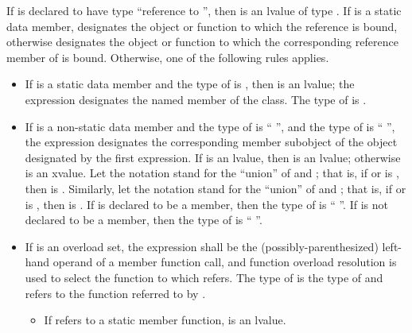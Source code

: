 \pnum
If  is declared to have type ``reference to '', then
 is an lvalue of type .
If  is a static data member,
 designates the object or function to which
the reference is bound,
otherwise  designates the object or function to which
the corresponding reference member of  is bound.
Otherwise, one of the following rules applies.

\begin{itemize}
\item If  is a static data member and the type of 
is , then  is an lvalue; the expression designates
the named member of the class. The type of  is .

\item If  is a non-static data member and the type of
 is `` '', and the type of 
is `` '', the expression designates the corresponding
member subobject of the object designated by the first expression. If 
is an lvalue, then  is an lvalue;
otherwise  is an xvalue.
Let the notation  stand for the ``union'' of
 and ; that is, if  or 
is , then  is . Similarly,
let the notation  stand for the ``union'' of 
and ; that is, if  or  is
, then  is . If  is
declared to be a  member, then the type of 
is `` ''. If  is not declared to be a
 member, then the type of  is
``  ''.

\item If  is an overload set,
the expression shall be the (possibly-parenthesized) left-hand operand of
a member function call, and
function overload resolution
is used to select the function to which  refers.
The type of  is the type of 
and  refers to the function referred to by .

\begin{itemize}
\item If  refers to a static member function,
 is an lvalue.


\end{itemize}
\end{itemize}
